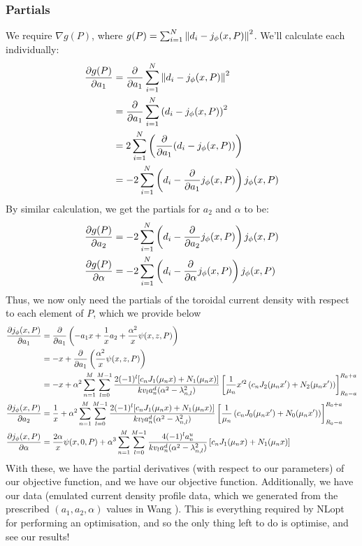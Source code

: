 \subsubsection{Partials}
We require $\nabla g(P)$, where $g(P) = \sum_{i = 1}^{N} \norm{d_i - j_{\phi}(x, P)}^2$. We'll calculate each individually:
\begin{align*}
    \pdv{g(P)}{a_1} &= \pdv{a_1} \sum_{i = 1}^{N} \norm{d_i - j_{\phi}(x, P)}^2 \\
    &= \pdv{a_1} \sum_{i = 1}^{N} \left ( d_i - j_{\phi}(x, P) \right )^2 \\
    &= 2 \sum_{i=1}^{N} \left ( \pdv{a_1} (d_i - j_{\phi}(x, P)) \right ) \\
    &= -2 \sum_{i=1}^{N} \left ( d_i - \pdv{a_1} j_{\phi}(x, P) \right ) j_{\phi}(x, P)
\end{align*}
By similar calculation, we get the partials for $a_2$ and $\alpha$ to be:
\begin{align*}
    \pdv{g(P)}{a_2} &= -2 \sum_{i=1}^{N} \left ( d_i - \pdv{a_2} j_{\phi}(x, P) \right ) j_{\phi}(x, P) \\
    \pdv{g(P)}{\alpha} &= -2 \sum_{i=1}^{N} \left ( d_i - \pdv{\alpha} j_{\phi}(x, P) \right ) j_{\phi}(x, P)
\end{align*}
Thus, we now only need the partials of the toroidal current density with respect to each element of $P$, which we provide below
\begin{align*}
    \pdv{j_{\phi}(x, P)}{a_1} &= \pdv{a_1} \left ( -a_1 x + \frac{1}{x} a_2 + \frac{\alpha^2}{x} \psi(x, z, P) \right ) \\
    &= -x + \pdv{a_1} \left ( \frac{\alpha^2}{x} \psi(x,z, P) \right ) \\
    &= -x + \alpha^2 \sum_{n = 1}^{M} \sum_{l = 0}^{M-1} \frac{2(-1)^l [c_n J_1(\mu_n x) + N_1(\mu_n x)]}{k v_l a_n^d (\alpha^2 - \lambda_{n,l}^2)} \left [ \frac{1}{\mu_n} x'^2 \left (c_n J_2(\mu_n x') + N_2(\mu_n x') \right ) \right ]_{R_0 - a}^{R_0 + a} \\
    \pdv{j_{\phi}(x,P)}{a_2} &= \frac{1}{x} + \alpha^2 \sum_{n = 1}^{M} \sum_{l = 0}^{M-1}  \frac{2(-1)^l [c_n J_1(\mu_n x) + N_1(\mu_n x)]}{k v_l a_n^d (\alpha^2 - \lambda_{n,l}^2)} \left [ \frac{1}{\mu_n} \left ( c_n J_0(\mu_n x') + N_0(\mu_n x') \right ) \right ]_{R_0 - a}^{R_0 + a} \\
    \pdv{j_{\phi}(x,P)}{\alpha} &= \frac{2\alpha}{x} \psi(x, 0, P) + \alpha^3 \sum_{n=1}^{M} \sum_{l=0}^{M-1} \frac{4(-1)^l a_n^u}{k v_l a_n^d (\alpha^2 - \lambda_{n,l}^2)} \left [ c_n J_1(\mu_n x) + N_1(\mu_n x) \right ]
\end{align*}
With these, we have the partial derivatives (with respect to our parameters) of our objective function, and we have our objective function. 
Additionally, we have our data (emulated current density profile data, which we generated from the prescribed $(a_1, a_2, \alpha)$ values 
in Wang \cite{wang-analytic-solution}). This is everything required by NLopt for performing an optimisation, and so the only thing left to do is optimise, and see our results!


